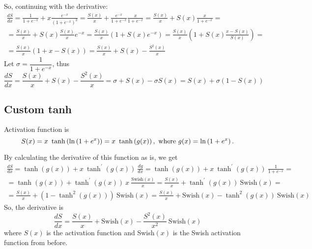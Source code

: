 So, continuing with the derivative:
\[
\begin{gathered}
\frac{dS}{dx} = \frac{1}{1+e^{-x}} + x \frac{e^{-x}}{\left( 1 + e^{-x} \right)^2} = \frac{S(x)}{x} + \frac{e^{-x}}{1+e^{-x}} \frac{x}{1+e^{-x}} = \frac{S(x)}{x} + S(x) \frac{x}{1+e^{-x}} = \\ 
= \frac{S(x)}{x} + S(x) \frac{S(x)}{x} e^{-x} = \frac{S(x)}{x} \left( 1 + S(x) e^{-x} \right) = \frac{S(x)}{x} \left( 1 + S(x)\frac{x-S(x)}{S(x)} \right) = \\
= \frac{S(x)}{x} \left( 1 + x - S(x) \right) = \frac{S(x)}{x} + S(x) - \frac{S^2(x)}{x}
\end{gathered}
\]
Let $\sigma = \dfrac{1}{1 + e^{-x}}$, thus 
\begin{equation}
\frac{dS}{dx} = \frac{S(x)}{x} + S(x) - \frac{S^2(x)}{x} = \sigma + S(x) - \sigma S(x) = S(x) + \sigma \left( 1 - S(x) \right)
\end{equation}

\subsection{Custom tanh}

Activation function is
\[
S(x) =  x \  \tanh\left(\ln\left(1+e^x\right)\right) = x \  \tanh\left(g(x)\right), \ \text{where} \ g(x) = \ln\left(1+e^x\right).
\]

By calculating the derivative of this function as is, we get 
\[
\begin{gathered}
\frac{dS}{dx} = \tanh(g(x)) + x \ \tanh^{'} (g(x)) \ \frac{dg}{dx} = \tanh(g(x)) + x\ \tanh^{'} (g(x)) \ \frac{1}{1+e^{-x}} =\\ 
= \tanh(g(x)) + \tanh^{'} (g(x)) \ x\ \frac{\text{Swish}(x)}{x} = \frac{S(x)}{x} + \tanh^{'} (g(x)) \ \text{Swish}(x) = \\
= \frac{S(x)}{x} + (1 - \tanh^{2} (g(x))) \ \text{Swish}(x) = \frac{S(x)}{x} + \text{Swish}(x) - \tanh^{2} (g(x)) \ \text{Swish}(x)
\end{gathered}
\]
So, the derivative is 
\begin{equation}
\frac{dS}{dx} = \frac{S(x)}{x} + \text{Swish}(x) - \frac{S^2(x)}{x^2} \ \text{Swish}(x)
\end{equation}
where $S(x)$ is the activation function and Swish$(x)$ is the Swish activation function from before.